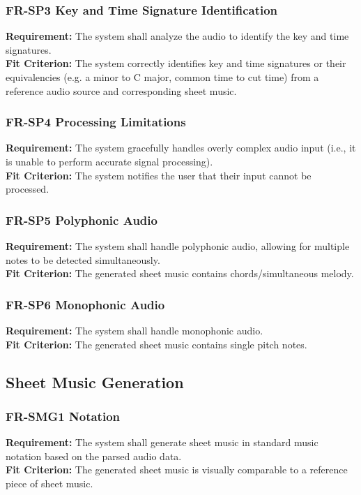 \documentclass[12pt]{article}
\begin{document}
\subsubsection*{FR-SP3 Key and Time Signature Identification} \label{FR-SP3}
\textbf{Requirement:}	The system shall analyze the audio to identify the key and time signatures. \\
\textbf{Fit Criterion:} The system correctly identifies key and time signatures or their equivalencies (e.g. a minor to C major, common time to cut time) from a reference audio source and corresponding sheet music.
\subsubsection*{FR-SP4 Processing Limitations} \label{FR-SP4}
\textbf{Requirement:} The system gracefully handles overly complex audio input (i.e., it is unable to perform accurate signal processing). \\
\textbf{Fit Criterion:} The system notifies the user that their input cannot be processed.
\subsubsection*{FR-SP5 Polyphonic Audio} \label{FR-SP5}
\textbf{Requirement:} The system shall handle polyphonic audio, allowing for multiple notes to be detected simultaneously. \\
\textbf{Fit Criterion:} The generated sheet music contains chords/simultaneous melody.
\subsubsection*{FR-SP6 Monophonic Audio} \label{FR-SP6}
\textbf{Requirement:} The system shall handle monophonic audio. \\
\textbf{Fit Criterion:} The generated sheet music contains single pitch notes.

\subsection{Sheet Music Generation}
\subsubsection*{FR-SMG1 Notation} \label{FR-SMG1}
\textbf{Requirement:} The system shall generate sheet music in standard music notation based on the parsed audio data. \\
\textbf{Fit Criterion:} The generated sheet music is visually comparable to a reference piece of sheet music.
\end{document}
